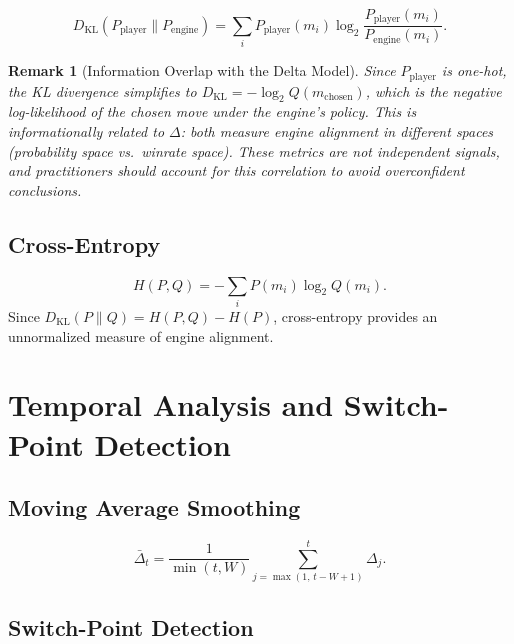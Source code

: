 \documentclass[11pt,a4paper]{article}
\newtheorem{remark}{Remark}
\begin{document}
\begin{equation}
    D_{\text{KL}}(P_{\text{player}} \| P_{\text{engine}}) = \sum_{i}
    P_{\text{player}}(m_i) \log_2 \frac{P_{\text{player}}(m_i)}
    {P_{\text{engine}}(m_i)}.
\end{equation}

\begin{remark}[Information Overlap with the Delta Model]
\label{rem:overlap}
Since $P_{\text{player}}$ is one-hot, the KL divergence simplifies to
$D_{\text{KL}} = -\log_2 Q(m_{\text{chosen}})$, which is the negative
log-likelihood of the chosen move under the engine's policy. This is
informationally related to $\Delta$: both measure engine alignment in
different spaces (probability space vs.\ winrate space). These metrics
are \emph{not independent} signals, and practitioners should account for
this correlation to avoid overconfident conclusions.
\end{remark}

\subsection{Cross-Entropy}

\begin{equation}
    H(P, Q) = -\sum_{i} P(m_i) \log_2 Q(m_i).
\end{equation}
Since $D_{\text{KL}}(P \| Q) = H(P, Q) - H(P)$, cross-entropy provides
an unnormalized measure of engine alignment.


\section{Temporal Analysis and Switch-Point Detection}
\label{sec:temporal}

\subsection{Moving Average Smoothing}

\begin{equation}
    \bar{\Delta}_t = \frac{1}{\min(t, W)} \sum_{j=\max(1,\, t-W+1)}^{t}
    \Delta_j.
\end{equation}

\subsection{Switch-Point Detection}
\end{document}
